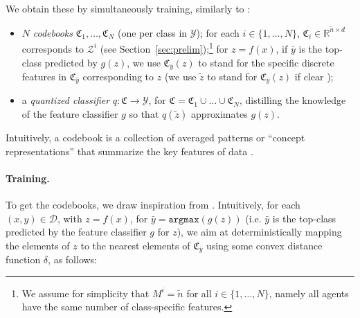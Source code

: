We obtain %
these by 
simultaneously training, similarly %
to \cite{kori2022explaining}: 
\begin{itemize}
    \item 
$N$ \emph{codebooks} 
$\mathfrak{C}_1, \ldots, \mathfrak{C}_N$ (one per class in $\mathcal{Y}$); for each $i \in \{1, \ldots, N\}$,
$\mathfrak{C}_i \in \mathbb{R}^{\tilde{n} \times d}$   corresponds to
$\mathcal{Z}^i$ (see Section~\ref{sec:prelim});\footnote{We assume  for simplicity that $M^i=\tilde{n}$  for all $i\in \{1, \ldots, N\}$, namely all agents have the same number of class-specific features.} for $z=f(x)$, if $\bar{y}$ is the  top-class predicted
by $g(z)$, we use $\mathfrak{C}_{\bar{y}}(z)$ to stand for the specific discrete features in 
$\mathfrak{C}_{\bar{y}}$ corresponding to $z$  (we use %
$\tilde{z}$ to stand for $\mathfrak{C}_{\bar{y}}(z)$ if clear%
);
\item 
a \emph{quantized classifier} $q:\mathfrak{C} \rightarrow \mathcal{Y}$,
for $\mathfrak{C}=\mathfrak{C}_1\cup \ldots \cup \mathfrak{C}_N$, distilling the knowledge of the feature classifier $g$ so that
$q(\tilde{z}%
)$ approximates $g(z)$.
\end{itemize}
Intuitively, 
a codebook is a collection of averaged patterns or ``concept representations'' that summarize the key features %
of data \cite{van2017neural}. 


\paragraph{Training.} To %
get the codebooks, %
we draw inspiration from \cite{van2017neural}. Intuitively, for each $(x,y) \!\in\! \mathcal{D}$, with $z\!=\!f(x)$, for $\bar{y} \!=\! \texttt{argmax}(g(z))$ (i.e. $\bar{y}$ is the top-class predicted by the feature classifier $g$ for $z$), we aim at
deterministically mapping the elements of $z$ to the nearest elements of $\mathfrak{C}_{\bar{y}}$ using some convex distance function $\delta$, as follows:

